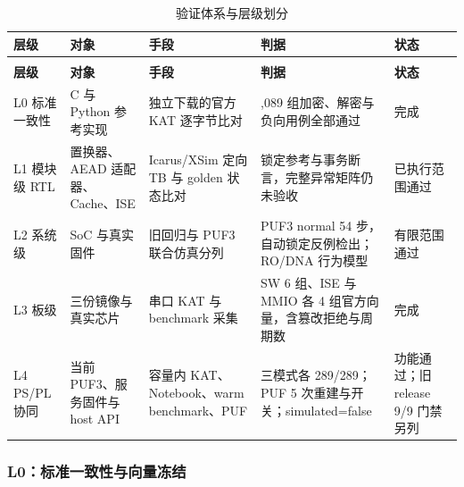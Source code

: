 {\small
\setlength{\tabcolsep}{4pt}
\renewcommand{\thetable}{3-6}
\begin{longtable}{@{}>{\raggedright\arraybackslash}p{}>{\raggedright\arraybackslash}p{}>{\raggedright\arraybackslash}p{}>{\raggedright\arraybackslash}p{}>{\raggedright\arraybackslash}p{}@{}}
\caption{验证体系与层级划分}\label{tab:3-6}\\
\toprule
\textbf{层级} & \textbf{对象} & \textbf{手段} & \textbf{判据} & \textbf{状态} \\
\midrule
\endfirsthead
\multicolumn{5}{@{}l}{\footnotesize 续表 3-6}\\
\toprule
\textbf{层级} & \textbf{对象} & \textbf{手段} & \textbf{判据} & \textbf{状态} \\
\midrule
\endhead
L0 标准一致性 & C 与 Python 参考实现 & 独立下载的官方 KAT 逐字节比对 & 1,089 组加密、解密与负向用例全部通过 & 完成 \\
L1 模块级 RTL & 置换器、AEAD 适配器、Cache、ISE & Icarus/XSim 定向 TB 与 golden 状态比对 & 锁定参考与事务断言，完整异常矩阵仍未验收 & 已执行范围通过 \\
L2 系统级 & SoC 与真实固件 & 旧回归与 PUF3 联合仿真分列 & PUF3 normal 54 步，自动锁定反例检出；RO/DNA 行为模型 & 有限范围通过 \\
L3 板级 & 三份镜像与真实芯片 & 串口 KAT 与 benchmark 采集 & SW 6 组、ISE 与 MMIO 各 4 组官方向量，含篡改拒绝与周期数 & 完成 \\
L4 PS/PL 协同 & 当前 PUF3、服务固件与 host API & 容量内 KAT、Notebook、warm benchmark、PUF & 三模式各 289/289；PUF 5 次重建与开关；simulated=false & 功能通过；旧 release 9/9 门禁另列 \\
\bottomrule
\end{longtable}
}


\Needspace{85pt}

\subsubsection{L0：标准一致性与向量冻结}\label{l0ux6807ux51c6ux4e00ux81f4ux6027ux4e0eux5411ux91cfux51bbux7ed3}

